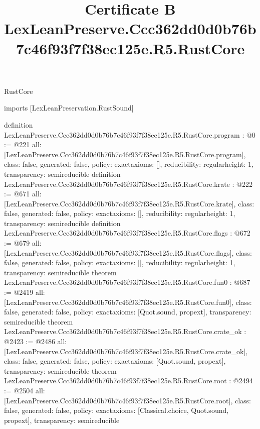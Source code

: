 \begin{lexlean}{RustCore}
\title{Certificate B LexLeanPreserve.Ccc362dd0d0b76b7c46f93f7f38ec125e.R5.RustCore}
\begin{coremodule}
imports [LexLeanPreservation.RustSound]

definition LexLeanPreserve.Ccc362dd0d0b76b7c46f93f7f38ec125e.R5.RustCore.program : @0 := @221 {
  all: [LexLeanPreserve.Ccc362dd0d0b76b7c46f93f7f38ec125e.R5.RustCore.program],
  class: false,
  generated: false,
  policy: exact{axioms: []},
  reducibility: regular{height: 1},
  transparency: semireducible
}
definition LexLeanPreserve.Ccc362dd0d0b76b7c46f93f7f38ec125e.R5.RustCore.krate : @222 := @671 {
  all: [LexLeanPreserve.Ccc362dd0d0b76b7c46f93f7f38ec125e.R5.RustCore.krate],
  class: false,
  generated: false,
  policy: exact{axioms: []},
  reducibility: regular{height: 1},
  transparency: semireducible
}
definition LexLeanPreserve.Ccc362dd0d0b76b7c46f93f7f38ec125e.R5.RustCore.flags : @672 := @679 {
  all: [LexLeanPreserve.Ccc362dd0d0b76b7c46f93f7f38ec125e.R5.RustCore.flags],
  class: false,
  generated: false,
  policy: exact{axioms: []},
  reducibility: regular{height: 1},
  transparency: semireducible
}
theorem LexLeanPreserve.Ccc362dd0d0b76b7c46f93f7f38ec125e.R5.RustCore.fun0 : @687 := @2419 {
  all: [LexLeanPreserve.Ccc362dd0d0b76b7c46f93f7f38ec125e.R5.RustCore.fun0],
  class: false,
  generated: false,
  policy: exact{axioms: [Quot.sound, propext]},
  transparency: semireducible
}
theorem LexLeanPreserve.Ccc362dd0d0b76b7c46f93f7f38ec125e.R5.RustCore.crate_ok : @2423 := @2486 {
  all: [LexLeanPreserve.Ccc362dd0d0b76b7c46f93f7f38ec125e.R5.RustCore.crate_ok],
  class: false,
  generated: false,
  policy: exact{axioms: [Quot.sound, propext]},
  transparency: semireducible
}
theorem LexLeanPreserve.Ccc362dd0d0b76b7c46f93f7f38ec125e.R5.RustCore.root : @2494 := @2504 {
  all: [LexLeanPreserve.Ccc362dd0d0b76b7c46f93f7f38ec125e.R5.RustCore.root],
  class: false,
  generated: false,
  policy: exact{axioms: [Classical.choice, Quot.sound, propext]},
  transparency: semireducible
}


\end{coremodule}
\end{lexlean}
